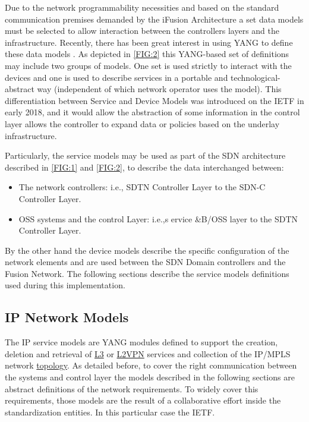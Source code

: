 \documentclass[a4paper,fleqn]{cas-dc}
\begin{document}
Due to the network programmability necessities and based on the standard communication premises demanded by the iFusion Architecture a set data models must be selected to allow interaction between the controllers layers and the infrastructure. Recently, there has been great interest in using YANG to define these data models \cite{claise2019network}. As depicted in \cref{FIG:2} this YANG-based set of definitions may include two groups of models. One set is used strictly to interact with the devices and one is used to describe services in a portable and technological-abstract way (independent of which network operator uses the model). 
This differentiation between Service and Device Models was introduced on the IETF in early 2018, and it would allow the abstraction of some information in the control layer \cite{wu2017service} allows the controller to expand data or policies based on the underlay infrastructure. 

Particularly, the service models may be used as part of the SDN architecture described in \cref{FIG:1} and \cref{FIG:2}, to describe the data interchanged between:
\begin{itemize}
    \item The network controllers: i.e., SDTN Controller Layer to the SDN-C Controller Layer.
    \item OSS systems and the control Layer: i.e.,s ervice \&B/OSS layer to the SDTN Controller Layer.
\end{itemize} 

By the other hand the device models describe the specific configuration of the network elements and are used between the SDN Domain controllers and the Fusion Network.  
The following sections describe the service models definitions used during this implementation. %

\subsection{IP Network Models}
\label{section:IPmodels}

The IP service models are YANG modules defined to support the creation, deletion and retrieval of \hyperref[section:l3nm]{L3} or \hyperref[section:l2nm]{L2VPN} services and collection of the IP/MPLS network \hyperref[subsection:IPtopo]{topology}. As detailed before, to cover the right communication between the systems and control layer the models described in the following sections are abstract definitions of the network requirements. To widely cover this requirements, those models are the result of a collaborative effort inside the standardization entities. In this particular case the IETF.
\end{document}

